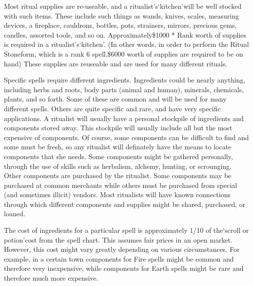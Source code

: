 \documentclass[twoside]{book}
\begin{document}
    {  
    Most ritual supplies are re-useable, and a ritualist's`kitchen'will be well stocked with such items. These include such things as wands, knives, scales, measuring devices, a fireplace, cauldrons, bottles, pots, strainers, mirrors, precious gems, candles, assorted tools, and so on. Approximately\$1000 * Rank worth of supplies is required in a ritualist's`kitchen'. (In other words, in order to perform the Ritual Stoneform, which is a rank 6 spell,\$6000 worth of supplies are required to be on hand) These supplies are reuseable and are used for many different rituals.
    }
  
    {  
    Specific spells require different ingredients. Ingredients could be nearly anything, including herbs and roots, body parts (animal and human), minerals, chemicals, plants, and so forth. Some of these are common and will be used for many different spells. Others are quite specific and rare, and have very specific applications. A ritualist will usually have a personal stockpile of ingredients and components stored away. This stockpile will usually include all but the most expensive of components. Of course, some components can be difficult to find and some must be fresh, so any ritualist will definately have the means to locate components that she needs. Some components might be gathered personally, through the use of skills such as herbalism, alchemy, hunting, or scrounging. Other components are purchased by the ritualist. Some components may be purchased at common merchants while others must be purchased from special (and sometimes illicit) vendors. Most ritualists will have known connections through which different components and supplies might be shared, purchased, or loaned.
    }
  
    {  
    The cost of ingredients for a particular spell is approximately 1/10 of the`scroll or potion'cost from the spell chart. This assumes fair prices in an open market. However, this cost might vary greatly depending on various circumstances. For example, in a certain town components for Fire spells might be common and therefore very inexpensive, while components for Earth spells might be rare and therefore much more expensive.
    }
  
\end{document}
